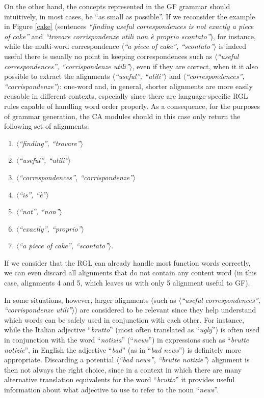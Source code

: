 On the other hand, the concepts represented in the GF grammar should intuitively, in most cases, be ``as small as possible''. If we reconsider the example in Figure \ref{cake} (sentences \textit{``finding useful correspondences is not exactly a piece of cake''} and \textit{``trovare corrispondenze utili non è proprio scontato''}), for instance, while the multi-word correspondence $\langle$\textit{``a piece of cake'', ``scontato''}$\rangle$ is indeed useful there is usually no point in keeping correspondences such as $\langle$\textit{``useful correspondences'', ``corrispondenze utili''}$\rangle$, even if they are correct, when it it also possible to extract the alignments $\langle$\textit{``useful'', ``utili''}$\rangle$ and $\langle$\textit{``correspondences'', ``corrispondenze''}$\rangle$: one-word and, in general, shorter alignments are more easily reusable in different contexts, especially since there are language-specific RGL rules capable of handling word order properly. 
As a consequence, for the purposes of grammar generation, the CA modules should in this case only return the following set of alignments: \smallskip

\begin{enumerate}
    \item $\langle$\textit{``finding'', ``trovare''}$\rangle$
    \item $\langle$\textit{``useful'', ``utili''}$\rangle$
    \item $\langle$\textit{``correspondences'', ``corrispondenze''}$\rangle$
    \item $\langle$\textit{``is'', ``è''}$\rangle$
    \item $\langle$\textit{``not'', ``non''}$\rangle$
    \item $\langle$\textit{``exactly'', ``proprio''}$\rangle$
    \item $\langle$\textit{``a piece of cake'', ``scontato''}$\rangle$.
\end{enumerate} \smallskip

If we consider that the RGL can already handle most function words correctly, we can even discard all alignments that do not contain any content word (in this case, alignments 4 and 5, which leaves us with only 5 alignment useful to GF). \smallskip

In some situations, however, larger alignments (such as $\langle$\textit{``useful correspondences'', ``corrispondenze utili''}$\rangle$) are considered to be relevant since they help understand which words can be safely used in conjunction with each other. For instance, while the Italian adjective ``\textit{brutto}'' (most often translated as ``\textit{ugly}'') is often used in conjunction with the word ``\textit{notizia}'' (``\textit{news}'') in expressions such as ``\textit{brutte notizie}'', in English the adjective ``\textit{bad}'' (as in ``\textit{bad news}'') is definitely more appropriate. Discarding a potential $\langle$\textit{``bad news''}, \textit{``brutte notizie''}$\rangle$ alignment is then not always the right choice, since in a context in which there are many alternative translation equivalents for the word ``\textit{brutto}'' it provides useful information about what adjective to use to refer to the noun ``\textit{news}''. \smallskip


